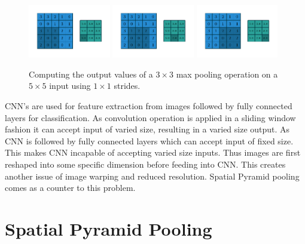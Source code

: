 \begin{figure}
    \includegraphics[width=0.32\textwidth]{pdf/numerical_max_pooling_06.pdf}
    \includegraphics[width=0.32\textwidth]{pdf/numerical_max_pooling_07.pdf}
    \includegraphics[width=0.32\textwidth]{pdf/numerical_max_pooling_08.pdf}
    \caption{\label{fig:numerical_max_pooling} Computing the output values of a
        $3 \times 3$ max pooling operation on a $5 \times 5$ input using $1
        \times 1$ strides.}
\end{figure}



CNN’s are used for feature extraction from images followed by fully connected layers for classification. As convolution operation is applied in a sliding window fashion it can accept input of varied size, resulting in a varied size output. As CNN is followed by fully connected layers which can accept input of fixed size. This makes CNN incapable of accepting varied size inputs. Thus images are first reshaped into some specific dimension before feeding into CNN. This creates another issue of image warping and reduced resolution. Spatial Pyramid pooling comes as a counter to this problem.

\section{Spatial Pyramid Pooling}


